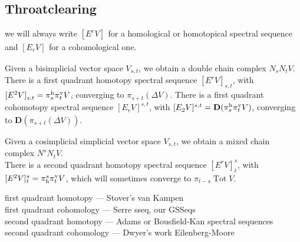\documentclass[11pt]{amsart}
\theoremstyle{plain}
\theoremstyle{definition}
\DeclareMathOperator{\Tot}{Tot}
\theoremstyle{plain}
\newcommand{\E}[5]{[E^{#1}_{#2}#3]^{#4}_{#5}}
\newcommand{\uver}{^\textup{v}}
\newcommand{\uhor}{^\textup{h}}
\newcommand{\dhor}{_\textup{h}}
\newcommand{\diag}{\Delta}
\newcommand{\dual}{\mathbf{D}}
\begin{document}
\begin{Conventions and notation}
\subsection{Throatclearing}


we will always write $\E{r}{}{V}{}{}$ for a homological or homotopical spectral sequence and $\E{}{r}{V}{}{}$ for a cohomological one.

Given a bisimplicial vector space $V_{s,t}$, we obtain a double chain complex $N_sN_tV$. There is a first quadrant homotopy spectral sequence $\E{r}{}{V}{}{s,t}$, with $\E{2}{}{V}{}{s,t}=\pi\uhor_s\pi\uver_tV$, converging to $\pi_{s+t}(\diag V)$.
There is a first quadrant cohomotopy spectral sequence $\E{}{r}{V}{s,t}{}$, with $\E{}{2}{V}{s,t}{}=\dual(\pi\uhor_s\pi\uver_tV)$, converging to $\dual(\pi_{s+t}(\diag V))$.

Given a cosimplicial simplicial vector space  $V_{s,t}$, we obtain a mixed chain complex $N^sN_tV$.\\
There is a second quadrant homotopy spectral sequence $\E{r}{}{V}{s}{t}$, with $\E{2}{}{V}{s}{t}=\pi\dhor^s\pi\uver_tV$, which will sometimes converge to $\pi_{t-s}\Tot V$.

\hfil

\noindent first quadrant homotopy --- Stover's van Kampen\\
first quadrant cohomology --- Serre sseq, our GSSeqs\\
second quadrant homotopy --- Adams or Bousfield-Kan spectral sequences\\
second quadrant cohomology --- Dwyer's work Eilenberg-Moore









\end{Conventions and notation} %
\end{document}
